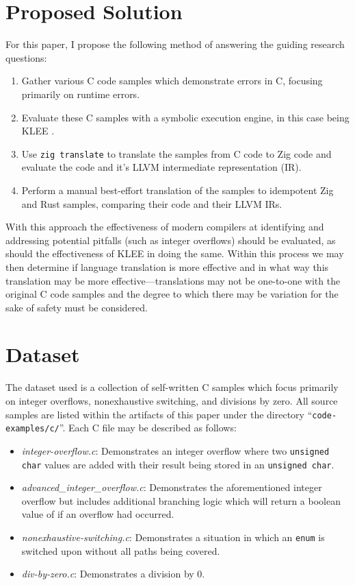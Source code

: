\documentclass[conference]{IEEEtran}
\begin{document}
\section{Proposed Solution}
For this paper, I propose the following method of answering the guiding research
questions:
\begin{enumerate}
    \item Gather various C code samples which demonstrate errors in C, focusing
        primarily on runtime errors.
    \item Evaluate these C samples with a symbolic execution engine, in this case
        being KLEE \cite{cadar2021klee}.
    \item Use \texttt{zig translate} to translate the samples from C code to Zig
        code and evaluate the code and it's LLVM intermediate representation (IR).
    \item Perform a manual best-effort translation of the samples to idempotent
        Zig and Rust samples, comparing their code and their LLVM IRs.
\end{enumerate}

With this approach the effectiveness of modern compilers at identifying and
addressing potential pitfalls (such as integer overflows) should be evaluated, as
should the effectiveness of KLEE in doing the same. Within this process we may then
determine if language translation is more effective and in what way this translation
may be more effective---translations may not be one-to-one with the original C code
samples and the degree to which there may be variation for the sake of safety must
be considered.


\section{Dataset}
The dataset used is a collection of self-written C samples which focus primarily on
integer overflows, nonexhaustive switching, and divisions by zero. All source samples
are listed within the artifacts of this paper under the directory
``\texttt{code-examples/c/}''. Each C file may be described as follows:
\begin{itemize}
    \item \textit{integer-overflow.c}: Demonstrates an integer overflow where two
        \texttt{unsigned char} values are added with their result being stored in an
        \texttt{unsigned char}.
    \item \textit{advanced\_integer\_overflow.c}: Demonstrates the aforementioned
        integer overflow but includes additional branching logic which will return a
        boolean value of if an overflow had occurred.
    \item \textit{nonexhaustive-switching.c}: Demonstrates a situation in which an
        \texttt{enum} is switched upon without all paths being covered.
    \item \textit{div-by-zero.c}: Demonstrates a division by 0.
\end{itemize}
\end{document}
